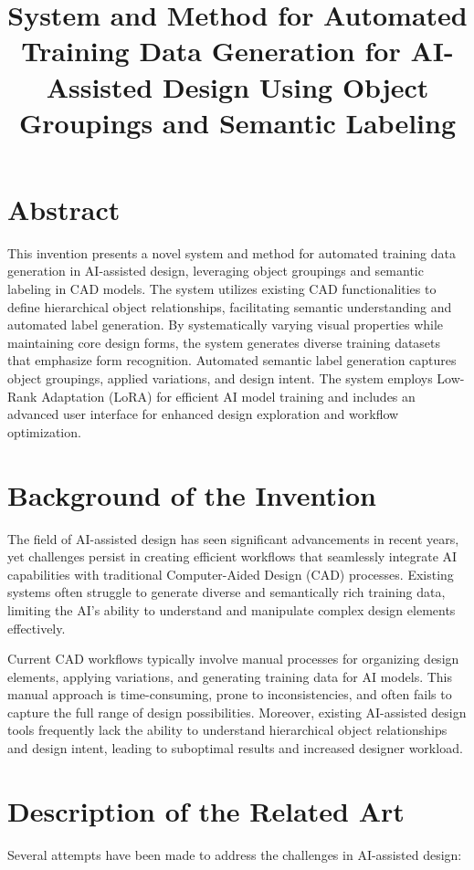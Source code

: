 \documentclass{article}
\title{System and Method for Automated Training Data Generation for AI-Assisted Design Using Object Groupings and Semantic Labeling}
\begin{document}
\section{Abstract}

This invention presents a novel system and method for automated training data generation in AI-assisted design, leveraging object groupings and semantic labeling in CAD models. The system utilizes existing CAD functionalities to define hierarchical object relationships, facilitating semantic understanding and automated label generation. By systematically varying visual properties while maintaining core design forms, the system generates diverse training datasets that emphasize form recognition. Automated semantic label generation captures object groupings, applied variations, and design intent. The system employs Low-Rank Adaptation (LoRA) for efficient AI model training and includes an advanced user interface for enhanced design exploration and workflow optimization.

\section{Background of the Invention}

The field of AI-assisted design has seen significant advancements in recent years, yet challenges persist in creating efficient workflows that seamlessly integrate AI capabilities with traditional Computer-Aided Design (CAD) processes. Existing systems often struggle to generate diverse and semantically rich training data, limiting the AI's ability to understand and manipulate complex design elements effectively.

Current CAD workflows typically involve manual processes for organizing design elements, applying variations, and generating training data for AI models. This manual approach is time-consuming, prone to inconsistencies, and often fails to capture the full range of design possibilities. Moreover, existing AI-assisted design tools frequently lack the ability to understand hierarchical object relationships and design intent, leading to suboptimal results and increased designer workload.

\section{Description of the Related Art}

Several attempts have been made to address the challenges in AI-assisted design:
\end{document}

